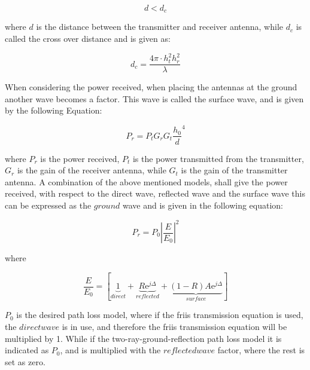 \begin{equation}
d < d_{c}
\label{two_ray_cond}
\end{equation}

where $d$ is the distance between the transmitter and receiver antenna, while $d_{c}$ is called the cross over distance and is given as:

\begin{equation}
d_{c} = \frac{4\pi \cdot h^2_t h^2_r }{\lambda}
\label{two_ray_cross_dis}
\end{equation}  

When considering the power received, when placing the antennas at the ground another wave becomes a factor. This wave is called the surface wave, and is given by the following Equation:

\begin{equation}
P_r=P_tG_rG_t\frac{h_0}{d}^4
\label{surface_wave}
\end{equation}

where $P_{r}$ is the power received, $P_{t}$ is the power transmitted from the transmitter, $G_{r}$ is the gain of the receiver antenna, while $G_{t}$ is the gain of the transmitter antenna. A combination of the above mentioned models, shall give the power received, with respect to the direct wave, reflected wave and the surface wave this can be expressed as the $ground$ wave and is given in the following equation:


\begin{equation}
P_r=P_0 \left|\frac{E}{E_0}\right|^2 
\label{ground_wave}
\end{equation}

where

\begin{equation}
\frac{E}{E_{0}}=[\underbrace{1}_{direct}+\underbrace{R\text{e}^{j\Delta}}_{reflected}+\underbrace{(1-R)A\text{e}^{j\Delta}}_{surface}]
\end{equation}

$P_{0}$ is the desired path loss model, where if the friis transmission equation is used, the $direct wave$ is in use, and therefore the friis transmission equation will be multiplied by 1. While if the two-ray-ground-reflection path loss model it is indicated as $P_{0}$, and is multiplied with the $reflected wave$ factor, where the rest is set as zero. 
















